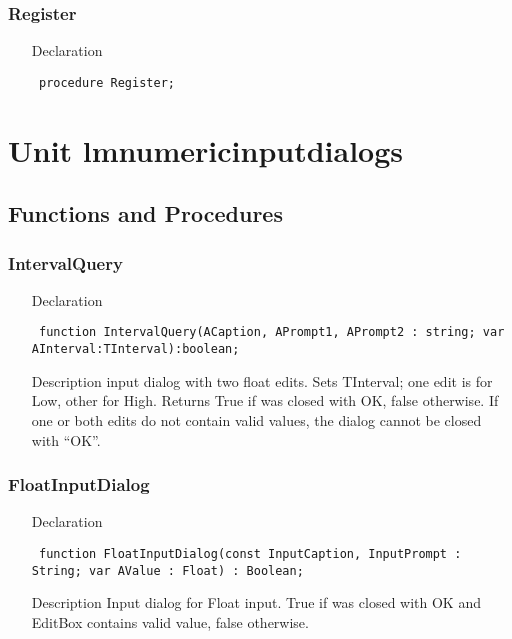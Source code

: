 \documentclass[12pt,a4paper,oneside]{report}
\newcommand{\declarationitem}[1]{{\addfontfeatures{FakeSlant} #1}}
\newcommand{\descriptiontitle}[1]{{\addfontfeatures{FakeSlant}#1}}
\newcommand{\code}[1]{\texttt{#1}}
\begin{document}
\subsection{Register}
\label{lmnumericedits-Register}
\begin{itemize}\item[\declarationitem{Declaration}\hfill]
\begin{flushleft}
\code{
procedure Register;}

\end{flushleft}

\end{itemize}
\chapter{Unit lmnumericinputdialogs}
\label{lmnumericinputdialogs}
\section{Functions and Procedures}
\subsection{IntervalQuery}
\label{lmnumericinputdialogs-IntervalQuery}
\begin{itemize}\item[\declarationitem{Declaration}\hfill]
\begin{flushleft}
\code{
function IntervalQuery(ACaption, APrompt1, APrompt2 : string; var AInterval:TInterval):boolean;}

\end{flushleft}

\par
\item[\descriptiontitle{Description}]
input dialog with two float edits. Sets TInterval; one edit is for Low, other for High. Returns True if was closed with OK, false otherwise. If one or both edits do not contain valid values, the dialog cannot be closed with ``OK''.

\end{itemize}
\subsection{FloatInputDialog}
\label{lmnumericinputdialogs-FloatInputDialog}
\begin{itemize}\item[\declarationitem{Declaration}\hfill]
\begin{flushleft}
\code{
function FloatInputDialog(const InputCaption, InputPrompt : String; var AValue : Float) : Boolean;}
\end{flushleft}
\item[\descriptiontitle{Description}]
Input dialog for Float input. True if was closed with OK and EditBox contains valid value, false otherwise. 
\end{itemize}
\end{document}
